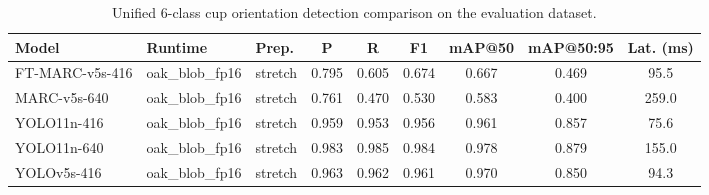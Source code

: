 \begin{table}[t]
  \centering
  \caption{Unified 6-class cup orientation detection comparison on the evaluation dataset.}
  \label{tab:yolo-comparison}
  \begin{tabular}{lllcccccc}
    \toprule
    Model & Runtime & Prep. & P & R & F1 & mAP@50 & mAP@50:95 & Lat. (ms) \\
    \midrule
    FT-MARC-v5s-416 & oak\_blob\_fp16 & stretch & 0.795 & 0.605 & 0.674 & 0.667 & 0.469 & 95.5 \\
    MARC-v5s-640 & oak\_blob\_fp16 & stretch & 0.761 & 0.470 & 0.530 & 0.583 & 0.400 & 259.0 \\
    YOLO11n-416 & oak\_blob\_fp16 & stretch & 0.959 & 0.953 & 0.956 & 0.961 & 0.857 & 75.6 \\
    YOLO11n-640 & oak\_blob\_fp16 & stretch & 0.983 & 0.985 & 0.984 & 0.978 & 0.879 & 155.0 \\
    YOLOv5s-416 & oak\_blob\_fp16 & stretch & 0.963 & 0.962 & 0.961 & 0.970 & 0.850 & 94.3 \\
    \bottomrule
  \end{tabular}
\end{table}
